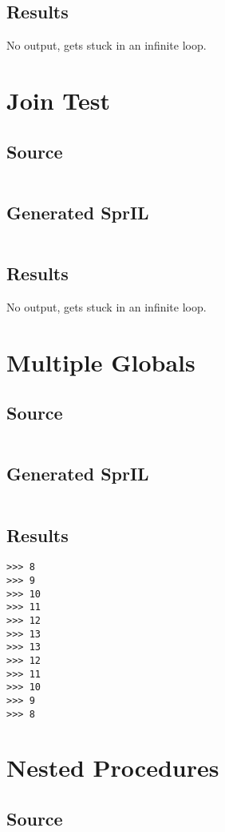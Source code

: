 \documentclass[twoside]{report}
\begin{document}
\subsection{Results}
No output, gets stuck in an infinite loop.

\section{Join Test}
\subsection{Source}
\inputminted[tabsize=4,linenos,firstnumber=1]{text}{../test/join_test.shl}
\subsection{Generated SprIL}
\inputminted[tabsize=4,linenos,firstnumber=0]{text}{../test/join_test_gen.txt}
\subsection{Results}
No output, gets stuck in an infinite loop.

\section{Multiple Globals}
\subsection{Source}
\inputminted[tabsize=4,linenos,firstnumber=1]{text}{../test/multiple_globals.shl}
\subsection{Generated SprIL}
\inputminted[tabsize=4,linenos,firstnumber=0]{text}{../test/multiple_globals_gen.txt}
\subsection{Results}
\begin{verbatim}
>>> 8
>>> 9
>>> 10
>>> 11
>>> 12
>>> 13
>>> 13
>>> 12
>>> 11
>>> 10
>>> 9
>>> 8
\end{verbatim}

\section{Nested Procedures}
\subsection{Source}
\inputminted[tabsize=4,linenos,firstnumber=1]{text}{../test/nested_procedures.shl}
\end{document}
